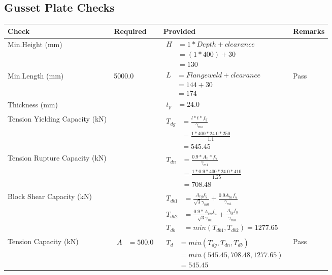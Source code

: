 \documentclass{article}%
\begin{document}
%
\newpage%
\subsection{Gusset Plate Checks}%
\label{subsec:GussetPlateChecks}%
\renewcommand{\arraystretch}{1.2}%
\begin{longtable}{|p{2.5cm}|p{5cm}|p{7.5cm}|p{1cm}|}%
\hline%
\rowcolor{OsdagGreen}%
Check&Required&Provided&Remarks\\%
\hline%
\endhead%
\hline%
Min.Height (mm)&&$\begin{aligned} H &= 1* Depth + clearance \\ &=(1*400)+30\\ &= 130\end{aligned}$&\\%
\hline%
Min.Length (mm)&5000.0&$\begin{aligned} L &= Flange weld + clearance \\ &= 144+30\\ &= 174\end{aligned}$&Pass\\%
\hline%
Thickness (mm)&&$\begin{aligned} t_p &=24.0\end{aligned}$&\\%
\hline%
Tension Yielding Capacity (kN)&&$\begin{aligned} T_{dg} &= \frac{l*t*f_y}{\gamma_{mo}}\\ &=\frac{1*400*24.0*250}{1.1}\\ &=545.45\end{aligned}$&\\%
\hline%
Tension Rupture Capacity (kN)&&$\begin{aligned} T_{dn} &= \frac{0.9*A_{n}*f_u}{\gamma_{m1}}\\ &=\frac{1*0.9*400*24.0*410}{1.25}\\ &=708.48\end{aligned}$&\\%
\hline%
Block Shear Capacity (kN)&&$\begin{aligned}T_{db1} &= \frac{A_{vg} f_{y}}{\sqrt{3} \gamma_{m0}} + \frac{0.9 A_{tn} f_{u}}{\gamma_{m1}}\\ T_{db2} &= \frac{0.9*A_{vn} f_{u}}{\sqrt{3} \gamma_{m1}} + \frac{A_{tg} f_{y}}{\gamma_{m0}}\\ T_{db} &= min(T_{db1}, T_{db2})= 1277.65\end{aligned}$&\\%
\hline%
Tension Capacity (kN)&$\begin{aligned} A &=500.0\end{aligned}$&$\begin{aligned} T_d &= min(T_{dg},T_{dn},T_{db})\\ &= min(545.45,708.48,1277.65)\\ &=545.45\end{aligned}$&Pass\\%
\hline%
\end{longtable}
\end{document}
